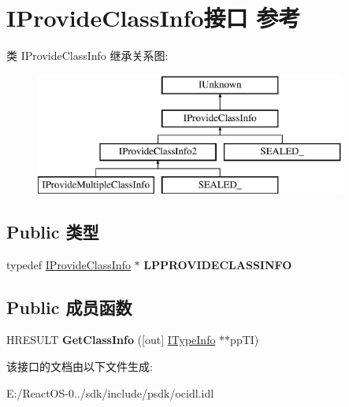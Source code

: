 \hypertarget{interface_i_provide_class_info}{}\section{I\+Provide\+Class\+Info接口 参考}
\label{interface_i_provide_class_info}
类 I\+Provide\+Class\+Info 继承关系图\+:\begin{figure}[H]
\begin{center}
\leavevmode
\includegraphics[height=4.000000cm]{interface_i_provide_class_info}
\end{center}
\end{figure}
\subsection*{Public 类型}
\begin{DoxyCompactItemize}
\item 
\mbox{\label{interface_i_provide_class_info_a59c7aa3df18f621a4444e4cc7a8e5957}} 
typedef \hyperlink{interface_i_provide_class_info}{I\+Provide\+Class\+Info} $\ast$ {\bfseries L\+P\+P\+R\+O\+V\+I\+D\+E\+C\+L\+A\+S\+S\+I\+N\+FO}
\end{DoxyCompactItemize}
\subsection*{Public 成员函数}
\begin{DoxyCompactItemize}
\item 
\mbox{\label{interface_i_provide_class_info_a63a414793176352e5c820c8d1be65d59}} 
H\+R\+E\+S\+U\+LT {\bfseries Get\+Class\+Info} (\mbox{[}out\mbox{]} \hyperlink{interface_i_type_info}{I\+Type\+Info} $\ast$$\ast$pp\+TI)
\end{DoxyCompactItemize}


该接口的文档由以下文件生成\+:\begin{DoxyCompactItemize}
\item 
E\+:/\+React\+O\+S-\/0../sdk/include/psdk/ocidl.\+idl\end{DoxyCompactItemize}
